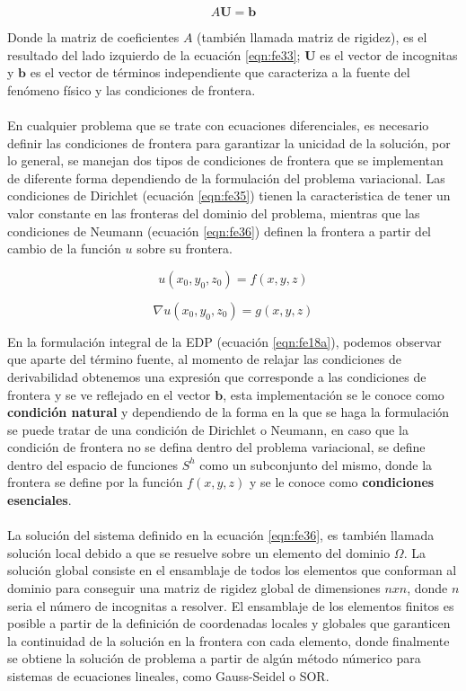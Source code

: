 \begin{equation}
 \label{eqn:fe34}
A\textbf{U}=\textbf{b}
\end{equation} 

Donde la matriz de coeficientes $A$ (también llamada matriz de rigidez), es el resultado del lado izquierdo de la ecuación \ref{eqn:fe33}; $\textbf{U}$ es el vector de incognitas y $\textbf{b}$ es el vector de términos independiente que caracteriza a la fuente del fenómeno físico y las condiciones de frontera.
\\
\\
En cualquier problema que se trate con ecuaciones diferenciales, es necesario definir las condiciones de frontera para garantizar la unicidad de la solución, por lo general, se manejan dos tipos de condiciones de frontera que se implementan de diferente forma dependiendo de la formulación del problema variacional. Las condiciones de Dirichlet (ecuación \ref{eqn:fe35}) tienen la caracteristica de tener un valor constante en las fronteras del dominio del problema, mientras que las condiciones de Neumann (ecuación \ref{eqn:fe36}) definen la frontera a partir del cambio de la función $u$ sobre su frontera.

\begin{equation}
 \label{eqn:fe35}
 u(x_{0},y_{0},z_{0})=f(x,y,z)
\end{equation} 

\begin{equation}
 \label{eqn:fe36}
 {\nabla}u(x_{0},y_{0},z_{0})=g(x,y,z)
\end{equation} 

En la formulación integral de la EDP (ecuación \ref{eqn:fe18a}), podemos observar que aparte del término fuente, al momento de relajar las condiciones de derivabilidad obtenemos una expresión que corresponde a las condiciones de frontera y se ve reflejado en el vector $\textbf{b}$, esta implementación se le conoce como \textbf{condición natural} y dependiendo de la forma en la que se haga la formulación se puede tratar de una condición de Dirichlet o Neumann, en caso que la condición de frontera no se defina dentro del problema variacional, se define dentro del espacio de funciones $S^{h}$ como un subconjunto del mismo, donde la frontera se define por la función $f(x,y,z)$ y se le conoce como \textbf{condiciones esenciales}.
\\
\\
La solución del sistema definido en la ecuación \ref{eqn:fe36}, es también llamada solución local debido a que se resuelve sobre un elemento del dominio $\Omega$. La solución global consiste en el ensamblaje de todos los elementos que conforman al dominio para conseguir una matriz de rigidez global de dimensiones $nxn$, donde $n$ seria el número de incognitas a resolver. El ensamblaje de los elementos finitos es posible a partir de la definición de coordenadas locales y globales que garanticen la continuidad de la solución en la frontera con cada elemento, donde finalmente se obtiene la solución de problema a partir de algún método númerico para sistemas de ecuaciones lineales, como Gauss-Seidel o SOR. 
\\
\\

